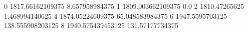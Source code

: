 0 1817.66162109375 8.657958984375
1 1809.003662109375 0.0
2 1810.47265625 1.468994140625
4 1874.05224609375 65.048583984375
6 1947.5595703125 138.555908203125
8 1940.575439453125 131.57177734375
